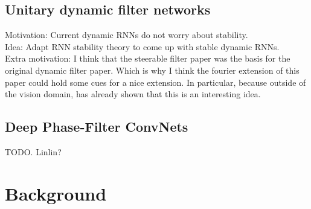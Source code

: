 \documentclass{article}
\begin{document}
\subsection{Unitary dynamic filter networks}
Motivation: Current dynamic RNNs do not worry about stability. \\
Idea: Adapt RNN stability theory to come up with stable dynamic RNNs. \\
Extra motivation: I think that the steerable filter paper \cite{Freeman} was the basis for the original dynamic filter paper. Which is why I think the fourier extension of this paper \cite{Michaelis} could hold some cues for a nice extension. In particular, because outside of the vision domain, \cite{Hyland} has already shown that this is an interesting idea. 

\subsection{Deep Phase-Filter ConvNets}
TODO. Linlin?

\section{Background}
\end{document}
